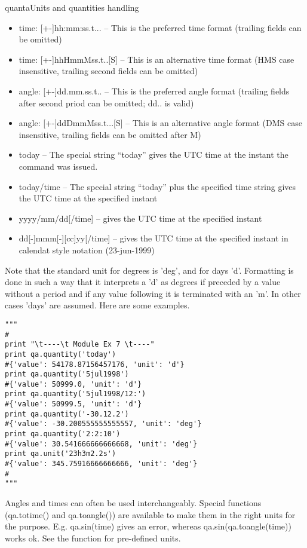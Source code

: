 \begin{ahmodule}{quanta}{Units and quantities handling}
\begin{ahdescription}
\begin{itemize}
	\item time: [+-]hh:mm:ss.t... -- This is the preferred time format (trailing fields can
             be omitted)
	\item time: [+-]hhHmmMss.t..[S]  -- This is an alternative time format (HMS case
                  insensitive, trailing second fields can be omitted)
	\item angle: [+-]dd.mm.ss.t..  -- This is the preferred angle format (trailing fields
                  after second priod can be omitted; dd.. is valid)
	\item angle: [+-]ddDmmMss.t...[S] -- This is an alternative angle format (DMS case
                  insensitive, trailing fields can be omitted after M)

	\item today -- The special string ``today'' gives the UTC time at the instant the command was issued. 
	\item today/time -- The special string ``today'' plus the specified time string gives the UTC time 
              at the specified instant
	\item yyyy/mm/dd[/time] -- gives the UTC time at the specified instant
	\item dd[-]mmm[-][cc]yy[/time] -- gives the UTC time at the specified instant in calendat style notation
               (23-jun-1999)


\end{itemize}

Note that the standard unit for degrees is 'deg', and for days 'd'. 
Formatting is done in such a way that it interprets a 'd' as degrees if
preceded by a value without a period and if any value following it is
terminated with an 'm'.  In other cases 'days' are assumed.  Here are
some examples. 

\begin{verbatim}
"""
#
print "\t----\t Module Ex 7 \t----"
print qa.quantity('today')
#{'value': 54178.87156457176, 'unit': 'd'}
print qa.quantity('5jul1998')
#{'value': 50999.0, 'unit': 'd'}
print qa.quantity('5jul1998/12:')
#{'value': 50999.5, 'unit': 'd'}
print qa.quantity('-30.12.2')
#{'value': -30.200555555555557, 'unit': 'deg'}
print qa.quantity('2:2:10')
#{'value': 30.541666666666668, 'unit': 'deg'}
print qa.unit('23h3m2.2s')  
#{'value': 345.75916666666666, 'unit': 'deg'}
#
"""
\end{verbatim}

Angles and times can often be used interchangeably.  Special functions
({\cf qa.totime()} and {\cf qa.toangle()}) are available to make them in
the right units for the purpose.  E.g.  {\cf qa.sin(time)} gives an
error, whereas {\cf qa.sin(qa.toangle(time))} works ok.  See
the  function for pre-defined units.  


\end{ahdescription}
\end{ahmodule}

